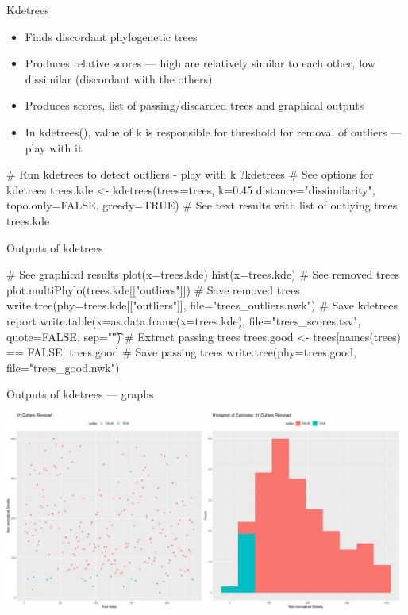 \documentclass[compress,  xelatex, 11pt, xcolor=x11names, aspectratio=169,
	hyperref={
		bookmarks=true,
		unicode=true,
		colorlinks=true,
		pdftitle={HybSeq course},
		plainpages=false,
		pdfauthor={Vojtech Zeisek},
		pdfsubject={Practical processing of HybSeq target enrichment sequencing data on computing grids like MetaCentrum},
		pdfcreator={XeLaTeX},
		pdfkeywords={BASH, command line, GNU, HybSeq, Linux, MetaCentrum, sequencing shell, target enrichment},
		linkcolor=Turquoise4, %
		anchorcolor=DodgerBlue4, %
		citecolor=DodgerBlue4, %
		filecolor=DodgerBlue4, %
		menucolor=Tan4, %
		urlcolor=DarkOliveGreen4 %
		},
	url={hyphens, lowtilde} %
	]{beamer}
\renewcommand{\texttt}[1]{\colorbox{Cornsilk2}{{\ttfamily #1}}}
\renewcommand{\alert}[1]{\textcolor{OrangeRed3}{#1}}
\begin{document}
\begin{frame}[fragile]{Kdetrees}
	\begin{itemize}
		\item Finds discordant phylogenetic trees
		\item Produces relative scores --- high are relatively similar to each other, low dissimilar (discordant with the others)
		\item Produces scores, list of passing/discarded trees and graphical outputs
		\item In \texttt{kdetrees()}, \alert{value of \texttt{k} is responsible for threshold for removal of outliers --- play with it}
	\end{itemize}
	\begin{spluscode}
    # Run kdetrees to detect outliers - play with k
    ?kdetrees # See options for kdetrees
    trees.kde <- kdetrees(trees=trees, k=0.45 distance="dissimilarity",
      topo.only=FALSE, greedy=TRUE)
    # See text results with list of outlying trees
    trees.kde
	\end{spluscode}
\end{frame}

\begin{frame}[fragile]{Outputs of kdetrees}
	\begin{spluscode}
    # See graphical results
    plot(x=trees.kde)
    hist(x=trees.kde)
    # See removed trees
    plot.multiPhylo(trees.kde[["outliers"]])
    # Save removed trees
    write.tree(phy=trees.kde[["outliers"]], file="trees_outliers.nwk")
    # Save kdetrees report
    write.table(x=as.data.frame(x=trees.kde), file="trees_scores.tsv",
      quote=FALSE, sep="\t")
    # Extract passing trees
    trees.good <- trees[names(trees) %
      == FALSE]
    trees.good
    # Save passing trees
    write.tree(phy=trees.good, file="trees_good.nwk")
	\end{spluscode}
\end{frame}

\begin{frame}{Outputs of kdetrees --- graphs}
	\begin{center}
		\includegraphics[height=6.5cm]{kdetrees.png}
	\end{center}
\end{frame}
\end{document}
